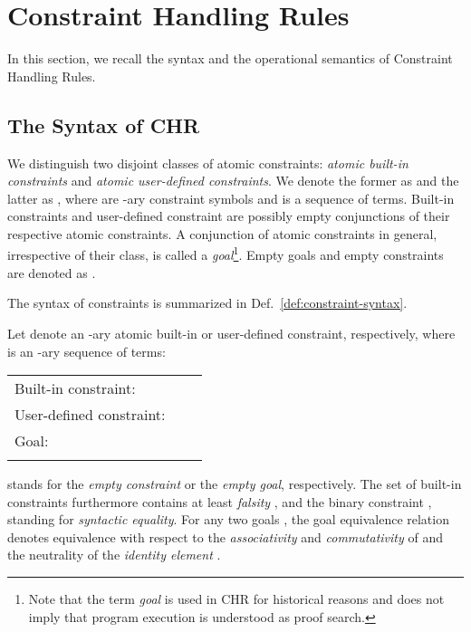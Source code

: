 \documentclass[acmtocl]{acmtrans2m}
\begin{document}
\section{Constraint Handling Rules}
\label{sec:chr}

In this section, we recall the syntax and the operational semantics  of
Constraint Handling Rules.

\subsection{The Syntax of CHR}
\label{sec:syn}

We distinguish two disjoint classes of atomic constraints: \emph{atomic built-in
constraints} and \emph{atomic user-defined constraints}. We denote the former as
 and the latter as , where  are -ary constraint symbols and
 is a sequence of  terms. Built-in constraints and user-defined
constraint are  possibly empty  conjunctions of their respective atomic
constraints. A conjunction of atomic constraints in general, irrespective of
their class, is called a \emph{goal}\footnote{Note that the term \emph{goal} is used in
CHR for historical reasons and does not imply that program execution is
understood as proof search.}. Empty goals and empty constraints are denoted as
.

The syntax of constraints is summarized in
Def.~\ref{def:constraint-syntax}.

\begin{definition}
\label{def:constraint-syntax}
Let  denote an -ary atomic built-in or user-defined constraint, respectively,
where  is an -ary sequence of terms:
\begin{tabular}{l @{\quad} r @{} l}
\\
Built-in constraint: &  &  \\
User-defined constraint: &  &  \\
Goal: &   &  \\
\\
\end{tabular}

 stands for the \emph{empty constraint} or the \emph{empty goal},
respectively. The set of built-in constraints furthermore contains at least
\emph{falsity} , and the binary constraint , standing for
\emph{syntactic equality}.
For any two goals , the goal equivalence relation 
denotes equivalence with respect to the \emph{associativity} and
\emph{commutativity} of  and the neutrality of the \emph{identity
element} .
\end{definition}
\end{document}
